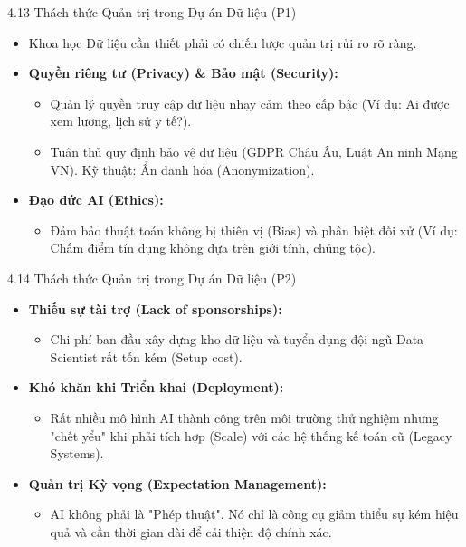 \documentclass[aspectratio=169]{beamer}
\begin{document}
\begin{frame}{4.13 Thách thức Quản trị trong Dự án Dữ liệu (P1)}
    \begin{itemize}
        \item Khoa học Dữ liệu cần thiết phải có chiến lược quản trị rủi ro rõ ràng.
        \item \textbf{Quyền riêng tư (Privacy) \& Bảo mật (Security):}
        \begin{itemize}
            \item Quản lý quyền truy cập dữ liệu nhạy cảm theo cấp bậc (Ví dụ: Ai được xem lương, lịch sử y tế?).
            \item Tuân thủ quy định bảo vệ dữ liệu (GDPR Châu Âu, Luật An ninh Mạng VN). Kỹ thuật: Ẩn danh hóa (Anonymization).
        \end{itemize}
        \item \textbf{Đạo đức AI (Ethics):}
        \begin{itemize}
            \item Đảm bảo thuật toán không bị thiên vị (Bias) và phân biệt đối xử (Ví dụ: Chấm điểm tín dụng không dựa trên giới tính, chủng tộc).
        \end{itemize}
    \end{itemize}
\end{frame}

\begin{frame}{4.14 Thách thức Quản trị trong Dự án Dữ liệu (P2)}
    \begin{itemize}
        \item \textbf{Thiếu sự tài trợ (Lack of sponsorships):} 
        \begin{itemize}
            \item Chi phí ban đầu xây dựng kho dữ liệu và tuyển dụng đội ngũ Data Scientist rất tốn kém (Setup cost).
        \end{itemize}
        \item \textbf{Khó khăn khi Triển khai (Deployment):} 
        \begin{itemize}
            \item Rất nhiều mô hình AI thành công trên môi trường thử nghiệm nhưng "chết yểu" khi phải tích hợp (Scale) với các hệ thống kế toán cũ (Legacy Systems).
        \end{itemize}
        \item \textbf{Quản trị Kỳ vọng (Expectation Management):} 
        \begin{itemize}
            \item AI không phải là "Phép thuật". Nó chỉ là công cụ giảm thiểu sự kém hiệu quả và cần thời gian dài để cải thiện độ chính xác.
        \end{itemize}
    \end{itemize}
\end{frame}
\end{document}
